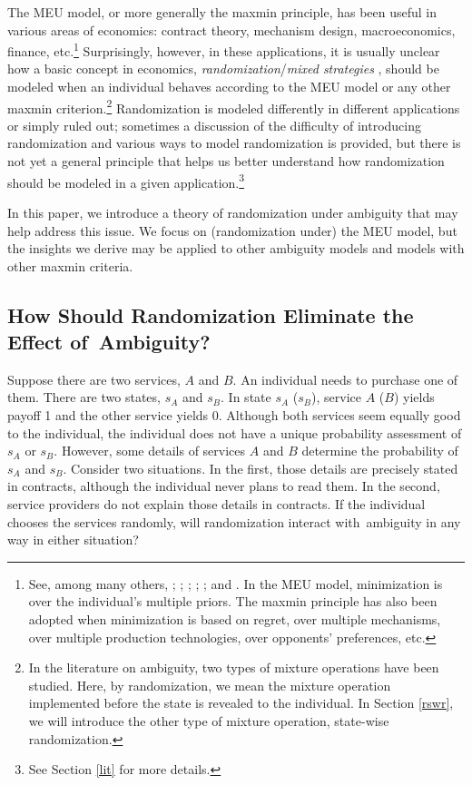 \documentclass[12pt, notitlepage]{article}
\begin{document}
The MEU model, or more generally the maxmin principle, has been useful in
various areas of economics: contract theory, mechanism design,
macroeconomics, finance, etc.\footnote{\label{other_mm}See, among many
others, \cite{HansenSargent10}; \cite{BergemannSchlag11}; \cite{Antic14}; 
\cite{EasleyOHaraYang14}; \cite{DiTillioKosMessner17}; and \cite%
{CarrascoFarinhaLuzKosEtAl18}. In the MEU model, minimization is over the
individual's multiple priors. The maxmin principle has also been adopted
when minimization is based on regret, over multiple mechanisms, over
multiple production technologies, over opponents' preferences, etc.}
Surprisingly, however, in these applications, it is usually unclear how a
basic concept in economics, \textit{randomization}/\textit{mixed strategies}%
, should be modeled when an individual behaves according to the MEU model or
any other maxmin criterion.\footnote{%
In the literature on ambiguity, two types of mixture operations have been
studied. Here, by randomization, we mean the mixture operation implemented
before the state is revealed to the individual. In Section \ref{rswr}, we
will introduce the other type of mixture operation, state-wise randomization.%
} Randomization is modeled differently in different applications or simply
ruled out; sometimes a discussion of the difficulty of introducing
randomization and various ways to model randomization is provided, but there
is not yet a general principle that helps us better understand how
randomization should be modeled in a given application.\footnote{%
See Section \ref{lit} for more details.}

In this paper, we introduce a theory of randomization under ambiguity that
may help address this issue. We focus on (randomization under) the MEU
model, but the insights we derive may be applied to other ambiguity models
and models with other maxmin criteria.

\subsection{How Should Randomization Eliminate the Effect of\ Ambiguity?}

\label{sec_1.1}Suppose there are two services, $A$ and $B$. An individual
needs to purchase one of them. There are two states, $s_{A}$ and $s_{B}$. In
state $s_{A}$ ($s_{B}$), service $A$ ($B$) yields payoff 1 and the other
service yields 0. Although both services seem equally good to the
individual, the individual does not have a unique probability assessment of $%
s_{A}$ or $s_{B}$. However, some details of services $A$ and $B$ determine
the probability of $s_{A}$ and $s_{B}$. Consider two situations. In the
first, those details are precisely stated in contracts, although the
individual never plans to read them. In the second, service providers do not
explain those details in contracts. If the individual chooses the services
randomly, will randomization interact with\ ambiguity in any way in either
situation?
\end{document}
